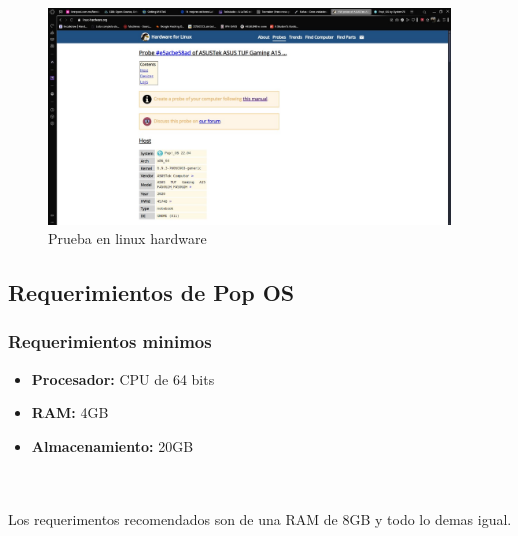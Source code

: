 \\\\
\begin{figure}[h]
  \centering
  \label{fig:img_linux_hardware}
  \includegraphics[width=0.95\textwidth]{./img/revision_linux-hardware.jpeg}
  \caption{Prueba en linux hardware}
\end{figure}

\clearpage

\subsection{Requerimientos de Pop OS}

\subsubsection{Requerimientos minimos}

\begin{itemize}
  \item \textbf{Procesador:} CPU de 64 bits
  \item \textbf{RAM:} 4GB
  \item \textbf{Almacenamiento:} 20GB
\end{itemize}

\\\\
Los requerimentos recomendados son de una RAM de 8GB y todo lo demas igual.
